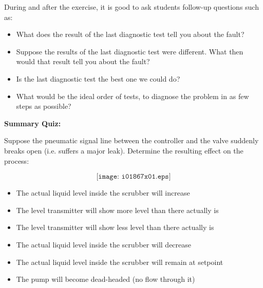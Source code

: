 During and after the exercise, it is good to ask students follow-up questions such as:

\begin{itemize}
\item{} What does the result of the last diagnostic test tell you about the fault?
\item{} Suppose the results of the last diagnostic test were different.  What then would that result tell you about the fault?
\item{} Is the last diagnostic test the best one we could do?
\item{} What would be the ideal order of tests, to diagnose the problem in as few steps as possible?
\end{itemize}

\vfil \eject

\noindent
{\bf Summary Quiz:}

Suppose the pneumatic signal line between the controller and the valve suddenly breaks open (i.e. suffers a major leak).  Determine the resulting effect on the process:

$$\texttt{[image: i01867x01.eps]}$$

\begin{itemize}
\item{} The actual liquid level inside the scrubber will increase
\vskip 5pt
\item{} The level transmitter will show more level than there actually is 
\vskip 5pt
\item{} The level transmitter will show less level than there actually is
\vskip 5pt
\item{} The actual liquid level inside the scrubber will decrease
\vskip 5pt
\item{} The actual liquid level inside the scrubber will remain at setpoint
\vskip 5pt
\item{} The pump will become dead-headed (no flow through it)
\end{itemize}




